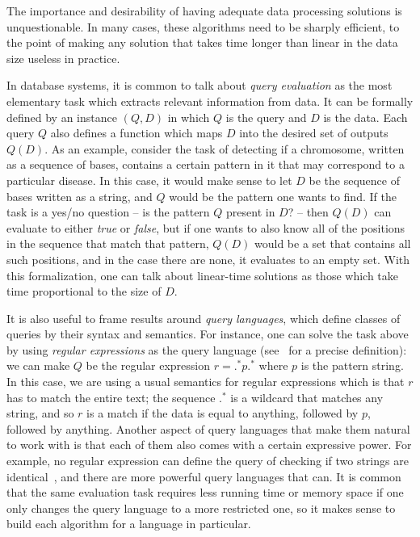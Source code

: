 The importance and desirability of having adequate data processing solutions is unquestionable. In many cases, these algorithms need to be sharply efficient, to the point of making any solution that takes time longer than linear in the data size useless in practice.

In database systems, it is common to talk about {\it query evaluation} as the most elementary task which extracts relevant information from data. It can be formally defined by an instance $(Q, D)$ in which $Q$ is the query and $D$ is the data. Each query $Q$ also defines a function which maps $D$ into the desired set of outputs $Q(D)$.
As an example, consider the task of detecting if a chromosome, written as a sequence of bases, contains a certain pattern in it that may correspond to a particular disease. In this case, it would make sense to let $D$ be the sequence of bases written as a string, and $Q$ would be the pattern one wants to find. If the task is a yes/no question -- is the pattern $Q$ present in $D$? -- then $Q(D)$ can evaluate to either {\it true} or {\it false}, but if one wants to also know all of the positions in the sequence that match that pattern, $Q(D)$ would be a set that contains all such positions, and in the case there are none, it evaluates to an empty set.
With this formalization, one can talk about linear-time solutions as those which take time proportional to the size of $D$.

It is also useful to frame results around {\it query languages}, which define classes of queries by their syntax and semantics. For instance, one can solve the task above by using {\it regular expressions} as the query language (see~\cite{automatahandbook} for a precise definition): we can make $Q$ be the regular expression $r = \texttt{.}^\texttt{*}p\texttt{.}^\texttt{*}$ where $p$ is the pattern string. In this case, we are using a usual semantics for regular expressions which is that $r$ has to match the entire text; the sequence $\texttt{.}^\texttt{*}$ is a wildcard that matches any string, and so $r$ is a match if the data is equal to anything, followed by $p$, followed by anything. Another aspect of query languages that make them natural to work with is that each of them also comes with a certain expressive power. For example, no regular expression can define the query of checking if two strings are identical~\cite{automatahandbook}, and there are more powerful query languages that can. It is common that the same evaluation task requires less running time or memory space if one only changes the query language to a more restricted one, so it makes sense to build each algorithm for a language in particular.

